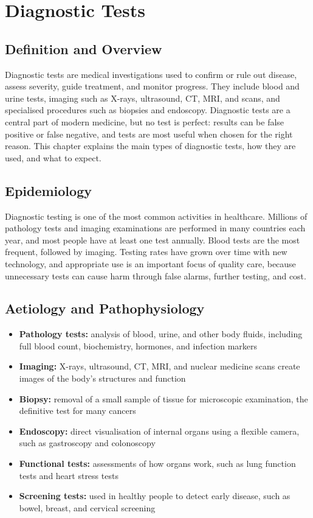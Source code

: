 \chapter{Diagnostic Tests}

\section*{Definition and Overview}
Diagnostic tests are medical investigations used to confirm or rule out disease, assess severity, guide treatment, and monitor progress. They include blood and urine tests, imaging such as X-rays, ultrasound, CT, MRI, and scans, and specialised procedures such as biopsies and endoscopy. Diagnostic tests are a central part of modern medicine, but no test is perfect: results can be false positive or false negative, and tests are most useful when chosen for the right reason. This chapter explains the main types of diagnostic tests, how they are used, and what to expect.

\section*{Epidemiology}
Diagnostic testing is one of the most common activities in healthcare. Millions of pathology tests and imaging examinations are performed in many countries each year, and most people have at least one test annually. Blood tests are the most frequent, followed by imaging. Testing rates have grown over time with new technology, and appropriate use is an important focus of quality care, because unnecessary tests can cause harm through false alarms, further testing, and cost.

\section*{Aetiology and Pathophysiology}
\begin{itemize}
    \item \textbf{Pathology tests:} analysis of blood, urine, and other body fluids, including full blood count, biochemistry, hormones, and infection markers
    \item \textbf{Imaging:} X-rays, ultrasound, CT, MRI, and nuclear medicine scans create images of the body's structures and function
    \item \textbf{Biopsy:} removal of a small sample of tissue for microscopic examination, the definitive test for many cancers
    \item \textbf{Endoscopy:} direct visualisation of internal organs using a flexible camera, such as gastroscopy and colonoscopy
    \item \textbf{Functional tests:} assessments of how organs work, such as lung function tests and heart stress tests
    \item \textbf{Screening tests:} used in healthy people to detect early disease, such as bowel, breast, and cervical screening
\end{itemize}

